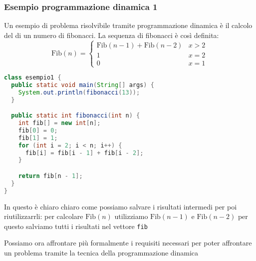\subsubsection{Esempio programmazione dinamica 1}
Un esempio di problema risolvibile tramite programmazione dinamica è il calcolo del di un numero di fibonacci. La sequenza di fibonacci è così definita:
\[
	\text{Fib}\left(n\right) = \begin{cases}
		\text{Fib}\left(n-1\right) + \text{Fib}\left(n-2\right) & x>2   \\
		1                                                       & x = 2 \\
		0                                                       & x = 1
	\end{cases}
\]
\begin{lstlisting}[language = java, frame = none]
class esempio1 {
  public static void main(String[] args) {
    System.out.println(fibonacci(13));
  }

  public static int fibonacci(int n) {
    int fib[] = new int[n];
    fib[0] = 0;
    fib[1] = 1;
    for (int i = 2; i < n; i++) {
      fib[i] = fib[i - 1] + fib[i - 2];
    }

    return fib[n - 1];
  }
}
\end{lstlisting}

In questo è chiaro chiaro come possiamo salvare i risultati intermedi per poi riutilizzarrli: per calcolare $ \text{Fib}\left(n\right) $ utilizziamo $ \text{Fib}\left(n-1\right) $ e $ \text{Fib}\left(n-2\right) $ per questo salviamo tutti i risultati nel vettore \verb|fib|

\vskip3mm
Possiamo ora affrontare più formalmente i requisiti necessari per poter affrontare un problema tramite la tecnica della programmazione dinamica
